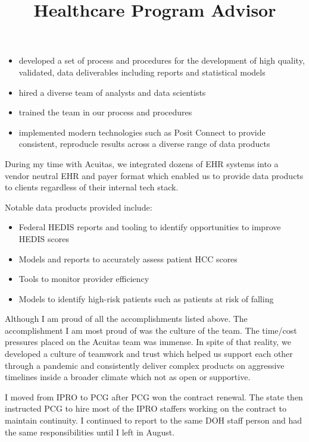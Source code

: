 \documentclass[line, mm, 10pt]{res}
\begin{document}
\begin{resume}
\begin{position}
    \begin{itemize}
    \item developed a set of process and procedures for the development of high
    quality, validated, data deliverables including reports and statistical models
    \item hired a diverse team of analysts and data scientists
    \item trained the team in our process and procedures
    \item implemented modern technologies such as Posit Connect to provide
    consistent, reproducle results across a diverse range of data products
    \end{itemize}

    During my time with Acuitas, we integrated dozens of EHR systems into a
    vendor neutral EHR and payer format which enabled us to provide data
    products to clients regardless of their internal tech stack.
    
    Notable data products provided include:

    \begin{itemize}
      \item Federal HEDIS reports and tooling to identify opportunities to
      improve HEDIS scores
      \item Models and reports to accurately assess patient HCC scores
      \item Tools to monitor provider efficiency
      \item Models to identify high-risk patients such as patients at risk of
      falling
    \end{itemize}
  \end{position}

  Although I am proud of all the accomplishments listed above. The
  accomplishment I am most proud of was the culture of the team. The time/cost
  pressures placed on the Acuitas team was immense. In spite of that reality, we
  developed a culture of teamwork and trust which helped us support each other
  through a pandemic and consistently deliver complex products on aggressive
  timelines inside a broader climate which not as open or supportive.

  \title{Healthcare Program Advisor}
  \begin{position}
    I moved from IPRO to PCG after PCG won the contract renewal. The state then
    instructed PCG to hire most of the IPRO staffers working on the contract to
    maintain continuity. I continued to report to the same DOH staff person and
    had the same responsibilities until I left in August.
  \end{position}


\end{resume}
\end{document}
